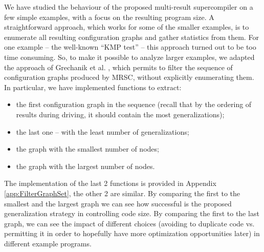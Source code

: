 \documentclass[submission,copyright,creativecommons]{eptcs}
\begin{document}
We have studied the behaviour of the proposed multi-result supercompiler on a few simple
examples, with a focus on the resulting program size.
A straightforward approach, which works for some of the smaller examples,
is to enumerate all resulting configuration graphs and gather statistics from them.
For one example -- the well-known ``KMP test'' -- this approach turned out to be too
time consuming.
So, to make it possible to analyze larger examples, we adapted the approach 
of Grechanik et al. \cite{Romanenko2014StagedMRSC}, which permits to filter
the sequence of configuration graphs produced by MRSC, without explicitly
enumerating them.
In particular, we have implemented functions to extract:
\begin{itemize}
  \item the first configuration graph in the sequence (recall that by the ordering of 
    results during driving, it should contain the most generalizations);
  \item the last one -- with the least number of generalizations;
  \item the graph with the smallest number of nodes;
  \item the graph with the largest number of nodes.
\end{itemize}
The implementation of the last 2 functions is provided in Appendix \ref{app:FilterGraphSet},
the other 2 are similar.
By comparing the first to the smallest and the largest graph we can see how 
successful is the proposed generalization strategy in controlling code size.
By comparing the first to the last graph, we can see the impact of different choices
(avoiding to duplicate code vs. permitting it in order to hopefully have more optimization opportunities later)
in different example programs.
\end{document}

